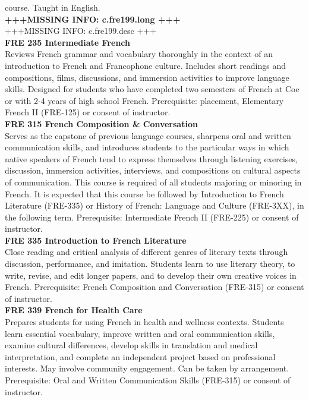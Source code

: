 \documentclass[
  letterpaper,
]{scrbook}
\begin{document}
course. Taught in English.\\
\textbf{+++MISSING INFO: c.fre199.long +++}\\
+++MISSING INFO: c.fre199.desc +++\\
\textbf{FRE 235 Intermediate French}\\
Reviews French grammar and vocabulary thoroughly in the context of an
introduction to French and Francophone culture. Includes short readings
and compositions, films, discussions, and immersion activities to
improve language skills. Designed for students who have completed two
semesters of French at Coe or with 2-4 years of high school French.
Prerequisite: placement, Elementary French II (FRE-125) or consent of
instructor.\\
\textbf{FRE 315 French Composition \& Conversation}\\
Serves as the capstone of previous language courses, sharpens oral and
written communication skills, and introduces students to the particular
ways in which native speakers of French tend to express themselves
through listening exercises, discussion, immersion activities,
interviews, and compositions on cultural aspects of communication. This
course is required of all students majoring or minoring in French. It is
expected that this course be followed by Introduction to French
Literature (FRE-335) or History of French: Language and Culture
(FRE-3XX), in the following term. Prerequisite: Intermediate French II
(FRE-225) or consent of instructor.\\
\textbf{FRE 335 Introduction to French Literature}\\
Close reading and critical analysis of different genres of literary
texts through discussion, performance, and imitation. Students learn to
use literary theory, to write, revise, and edit longer papers, and to
develop their own creative voices in French. Prerequisite: French
Composition and Conversation (FRE-315) or consent of instructor.\\
\textbf{FRE 339 French for Health Care}\\
Prepares students for using French in health and wellness contexts.
Students learn essential vocabulary, improve written and oral
communication skills, examine cultural differences, develop skills in
translation and medical interpretation, and complete an independent
project based on professional interests. May involve community
engagement. Can be taken by arrangement. Prerequisite: Oral and Written
Communication Skills (FRE-315) or consent of instructor.\\
\end{document}
